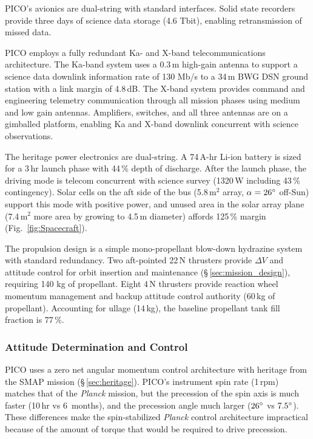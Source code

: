 PICO's avionics are dual-string with standard interfaces. Solid state
recorders provide three days of science data storage (4.6 Tbit), enabling
retransmission of missed data.

PICO employs a fully redundant Ka- and X-band telecommunications
architecture. The Ka-band system uses a 0.3\,m high-gain antenna to
support a science data downlink information rate of 130 Mb/s to a
34\,m BWG DSN ground station with a link margin of 4.8\,dB. The X-band
system provides command and engineering telemetry communication
through all mission phases using medium and low gain
antennas. Amplifiers, switches, and all three antennas are on a
gimballed platform, enabling Ka and X-band downlink concurrent with
science observations.

 The heritage power electronics are dual-string.
A 74\,A-hr Li-ion battery is sized for a 3\,hr launch phase with 44\,\% depth of discharge.
After the launch phase, the driving
mode is telecom concurrent with science survey (1320\,W including 43\,\% contingency).
Solar cells on the aft side of the bus (5.8\,m$^2$ array, $\alpha=26^\circ$ off-Sun) support this mode with positive power,  and unused area in the solar array plane (7.4\,m$^2$ more area by growing to 4.5\,m diameter) affords 125\,\% margin
(Fig.~\ref{fig:Spacecraft}).

The propulsion design is a simple mono-propellant blow-down hydrazine
system with standard redundancy. Two aft-pointed 22\,N thrusters
provide $\Delta V$ and attitude control for orbit insertion and
maintenance (\S\,\ref{sec:mission_design}), requiring 140 kg of
propellant.  Eight 4\,N thrusters provide reaction wheel momentum
management and backup attitude control authority (60\,kg of
propellant). Accounting for ullage (14\,kg), the baseline propellant
tank fill fraction is 77\,\%.


\subsubsection{Attitude Determination and Control}
\label{sec:attitude_determination} %

PICO uses a zero net angular momentum control architecture with
heritage from the SMAP mission (\S\,\ref{sec:heritage}). PICO's instrument
spin rate (1\,rpm) matches that of the \textit{Planck} mission, but
the precession of the spin axis is much faster (10\,hr vs 6\, months),
and the precession angle much larger ($26^\circ$ vs
$7.5^\circ$). These differences make the spin-stabilized
\textit{Planck} control architecture impractical because of the amount
of torque that would be required to drive precession.


